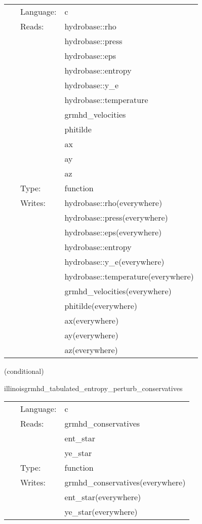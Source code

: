 \documentclass{article}
\begin{document}
\hspace{5mm}

 \begin{tabular*}{160mm}{cll} 
~ & Language:  & c \\ 
~ & Reads:  & hydrobase::rho \\ 
~& ~ &hydrobase::press\\ 
~& ~ &hydrobase::eps\\ 
~& ~ &hydrobase::entropy\\ 
~& ~ &hydrobase::y\_e\\ 
~& ~ &hydrobase::temperature\\ 
~& ~ &grmhd\_velocities\\ 
~& ~ &phitilde\\ 
~& ~ &ax\\ 
~& ~ &ay\\ 
~& ~ &az\\ 
~ & Type:  & function \\ 
~ & Writes:  & hydrobase::rho(everywhere) \\ 
~& ~ &hydrobase::press(everywhere)\\ 
~& ~ &hydrobase::eps(everywhere)\\ 
~& ~ &hydrobase::entropy\\ 
~& ~ &hydrobase::y\_e(everywhere)\\ 
~& ~ &hydrobase::temperature(everywhere)\\ 
~& ~ &grmhd\_velocities(everywhere)\\ 
~& ~ &phitilde(everywhere)\\ 
~& ~ &ax(everywhere)\\ 
~& ~ &ay(everywhere)\\ 
~& ~ &az(everywhere)\\ 
\end{tabular*} 


\vspace{5mm}

   (conditional) 

\hspace{5mm} illinoisgrmhd\_tabulated\_entropy\_perturb\_conservatives 

\hspace{5mm}{\it entropy+tabulated version of illinoisgrmhd\_perturb\_conservatives } 


\hspace{5mm}

 \begin{tabular*}{160mm}{cll} 
~ & Language:  & c \\ 
~ & Reads:  & grmhd\_conservatives \\ 
~& ~ &ent\_star\\ 
~& ~ &ye\_star\\ 
~ & Type:  & function \\ 
~ & Writes:  & grmhd\_conservatives(everywhere) \\ 
~& ~ &ent\_star(everywhere)\\ 
~& ~ &ye\_star(everywhere)\\ 
\end{tabular*} 
\end{document}
